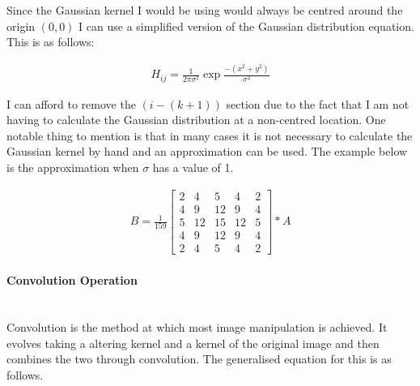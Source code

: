 \begin{flushleft}
            \BK
            Since the Gaussian kernel I would be using would always be centred around the origin $(0, 0)$ I can use a simplified version of the Gaussian distribution equation. This is as follows: \\ \bk
            
            \begin{gather*}
                H_{ij} = \frac{1}{2\pi\sigma^2} \exp \frac{-(x^2 + y^2)}{\sigma^2}
            \end{gather*}
            
            \BK
            I can afford to remove the $(i - (k + 1))$ section due to the fact that I am not having to calculate the Gaussian distribution at a non-centred location. One notable thing to mention is that in many cases it is not necessary to calculate the Gaussian kernel by hand and an approximation can be used. The example below is the approximation when $\sigma$ has a value of 1. \\ \bk
            
            \begin{gather*}
                B = \frac{1}{159} \begin{bmatrix} 
                2 & 4 & 5 & 4 & 2\\
                4 & 9 & 12 & 9 & 4\\
                5 & 12 & 15 & 12 & 5\\
                4 & 9 & 12 & 9 & 4\\
                2 & 4 & 5 & 4 & 2
                \end{bmatrix} * A
            \end{gather*}
            \bk
            
            \paragraph{Convolution Operation} \mbox{} \\
            Convolution is the method at which most image manipulation is achieved. It evolves taking a altering kernel and a kernel of the original image and then combines the two through convolution. The generalised equation for this is as follows. \\ \bk
            

\end{flushleft}
